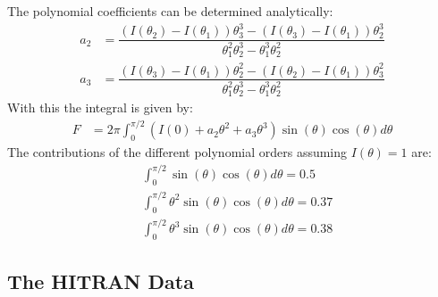 The polynomial coefficients can be determined analytically:
\begin{align}
	a_2 &= \dfrac{( I(\theta_2) - I(\theta_1) ) \theta_3^3 - (I(\theta_3) - I(\theta_1)) \theta_2^3}{\theta_1^2 \theta_2^3 - \theta_1^3 \theta_2^2} \\
	a_3 &= \dfrac{( I(\theta_3) - I(\theta_1) ) \theta_2^2 - (I(\theta_2) - I(\theta_1)) \theta_3^2}{\theta_1^2 \theta_2^3 - \theta_1^3 \theta_2^2}
 \end{align}
With this the integral is given by:
\begin{align}
	F &= 2 \pi \int_0^{\pi/2} \left(I(0) + a_2 \theta^2 + a_3 \theta^3\right) \sin(\theta) \cos(\theta)  d \theta
\end{align}
The contributions of the different polynomial orders assuming $I(\theta) = 1$ are:
\begin{align*}
	 &\int_0^{\pi/2} \sin(\theta) \cos(\theta) d \theta = 0.5 \\
	 &\int_0^{\pi/2} \theta^2 \sin(\theta) \cos(\theta) d \theta = 0.37  \\
	 &\int_0^{\pi/2} \theta^3 \sin(\theta) \cos(\theta) d \theta = 0.38
\end{align*}

\subsection{The HITRAN Data}

